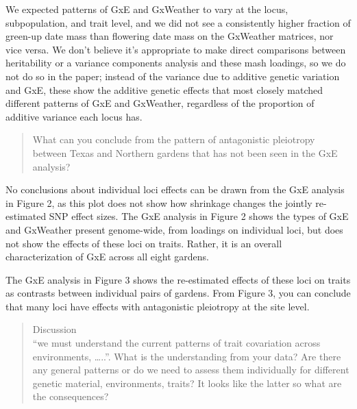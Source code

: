 \documentclass[
  letterpaper,
  DIV=11,
  numbers=noendperiod]{scrartcl}
\begin{document}
We expected patterns of GxE and GxWeather to vary at the locus,
subpopulation, and trait level, and we did not see a consistently higher
fraction of green-up date mass than flowering date mass on the GxWeather
matrices, nor vice versa. We don't believe it's appropriate to make
direct comparisons between heritability or a variance components
analysis and these mash loadings, so we do not do so in the paper;
instead of the variance due to additive genetic variation and GxE, these
show the additive genetic effects that most closely matched different
patterns of GxE and GxWeather, regardless of the proportion of additive
variance each locus has.

\begin{quote}
\begin{tcolorbox}[enhanced jigsaw, colframe=quarto-callout-warning-color-frame, rightrule=.15mm, leftrule=.75mm, left=2mm, breakable, toprule=.15mm, arc=.35mm, bottomrule=.15mm, opacityback=0, colback=white]

What can you conclude from the pattern of antagonistic pleiotropy
between Texas and Northern gardens that has not been seen in the GxE
analysis?

\end{tcolorbox}
\end{quote}

No conclusions about individual loci effects can be drawn from the GxE
analysis in Figure 2, as this plot does not show how shrinkage changes
the jointly re-estimated SNP effect sizes. The GxE analysis in Figure 2
shows the types of GxE and GxWeather present genome-wide, from loadings
on individual loci, but does not show the effects of these loci on
traits. Rather, it is an overall characterization of GxE across all
eight gardens.

The GxE analysis in Figure 3 shows the re-estimated effects of these
loci on traits as contrasts between individual pairs of gardens. From
Figure 3, you can conclude that many loci have effects with antagonistic
pleiotropy at the site level.

\begin{quote}
\begin{tcolorbox}[enhanced jigsaw, colframe=quarto-callout-warning-color-frame, rightrule=.15mm, leftrule=.75mm, left=2mm, breakable, toprule=.15mm, arc=.35mm, bottomrule=.15mm, opacityback=0, colback=white]

Discussion\\
``we must understand the current patterns of trait covariation across
environments, \ldots..''. What is the understanding from your data? Are
there any general patterns or do we need to assess them individually for
different genetic material, environments, traits? It looks like the
latter so what are the consequences?

\end{tcolorbox}
\end{quote}
\end{document}
